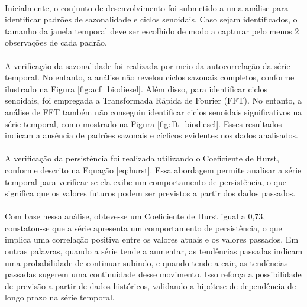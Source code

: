 \paragraph{} Inicialmente, o conjunto de desenvolvimento foi submetido a uma análise para identificar padrões de sazonalidade e ciclos senoidais. Caso sejam identificados, o tamanho da janela temporal deve ser escolhido de modo a capturar pelo menos 2 observações de cada padrão.
\paragraph{} A verificação da sazonalidade foi realizada por meio da autocorrelação da série temporal. No entanto, a análise não revelou ciclos sazonais completos, conforme ilustrado na Figura \ref{fig:acf_biodiesel}. Além disso, para identificar ciclos senoidais, foi empregada a Transformada Rápida de Fourier (FFT). No entanto, a análise de FFT também não conseguiu identificar ciclos senoidais significativos na série temporal, como mostrado na Figura \ref{fig:fft_biodiesel}. Esses resultados indicam a ausência de padrões sazonais e cíclicos evidentes nos dados analisados.

\paragraph{} A verificação da persistência foi realizada utilizando o Coeficiente de Hurst, conforme descrito na Equação \ref{eq:hurst}. Essa abordagem permite analisar a série temporal para verificar se ela exibe um comportamento de persistência, o que significa que os valores futuros podem ser previstos a partir dos dados passados.
\paragraph{} Com base nessa análise, obteve-se um Coeficiente de Hurst igual a 0,73, constatou-se que a série apresenta um comportamento de persistência, o que implica uma correlação positiva entre os valores atuais e os valores passados. Em outras palavras, quando a série tende a aumentar, as tendências passadas indicam uma probabilidade de continuar subindo, e quando tende a cair, as tendências passadas sugerem uma continuidade desse movimento. Isso reforça a possibilidade de previsão a partir de dados históricos, validando a hipótese de dependência de longo prazo na série temporal.

